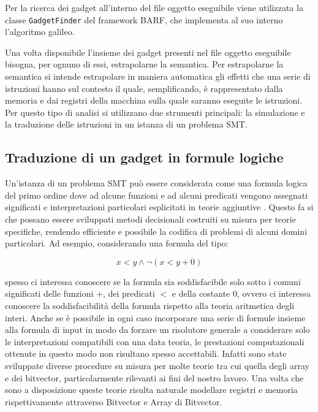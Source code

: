 Per la ricerca dei gadget all'interno del file oggetto eseguibile
viene utilizzata la classe \lstinline{GadgetFinder} del framework
BARF, che implementa al suo interno l'algoritmo
galileo\cite{Shacham-2007}.


Una volta disponibile l'insieme dei gadget presenti nel file oggetto
eseguibile bisogna, per ognuno di essi, estrapolarne la semantica. Per
estrapolarne la semantica si intende estrapolare in maniera automatica
gli effetti che una serie di istruzioni hanno sul contesto il quale,
semplificando, è rappresentato dalla memoria e dai registri della
macchina sulla quale saranno eseguite le istruzioni. Per questo tipo
di analisi si utilizzano due strumenti principali: la simulazione e la
traduzione delle istruzioni in un istanza di un problema SMT. 

\subsection{Traduzione di un gadget in formule logiche}

Un'istanza di un problema SMT può essere considerata come una formula
logica del primo ordine dove ad alcune funzioni e ad alcuni predicati
vengono assegnati significati e interpretazioni particolari
esplicitati in teorie aggiuntive \cite{Barrett-14}. Questo fa si che
possano essere sviluppati metodi decisionali costruiti su misura per
teorie specifiche, rendendo efficiente e possibile la codifica di
problemi di alcuni domini particolari. Ad esempio, considerando una
formula del tipo:

$$ x < y ∧ ¬(x < y + 0)$$

spesso ci interessa conoscere se la formula sia soddisfacibile solo
sotto i comuni significati delle funzioni $+$, dei predicati $<$ e
della costante $0$, ovvero ci interessa conoscere la soddisfacibilità
della formula rispetto alla teoria aritmetica degli interi. Anche se è
possibile in ogni caso incorporare una serie di formule insieme alla
formula di input in modo da forzare un risolutore generale a
considerare solo le interpretazioni compatibili con una data teoria,
le prestazioni computazionali ottenute in questo modo non risultano
spesso accettabili.  Infatti sono state sviluppate diverse procedure
su misura per molte teorie tra cui quella degli array e dei bitvector,
particolarmente rilevanti ai fini del nostro lavoro. Una volta che
sono a disposizione queste teorie risulta naturale modellare registri
e memoria rispettivamente attraverso Bitvector e Array di Bitvector.

